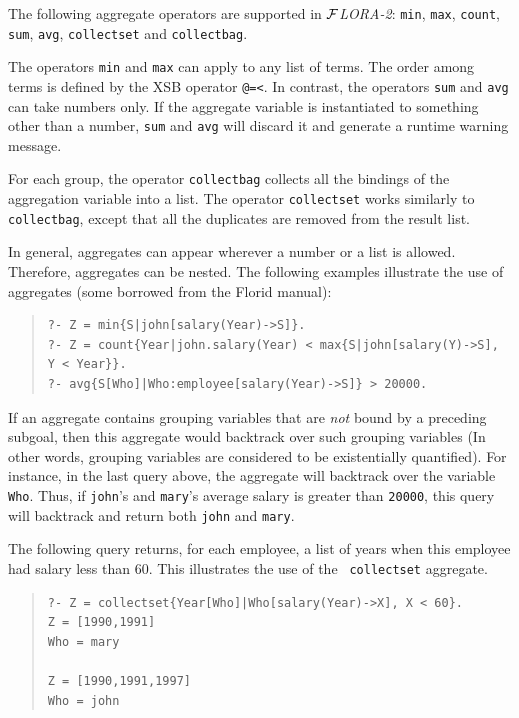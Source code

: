 \documentclass[11pt]{article}
\newcommand{\FLORA}{{\mbox{${\cal F}${\small\it LORA}\rm\emph{-2}}}\xspace}
\newcommand{\FLORID}{{\mbox{\sc Florid}}\xspace}
\begin{document}
%
The following aggregate operators are supported in \FLORA: {\tt min}, {\tt max},
{\tt count}, {\tt sum}, {\tt avg}, {\tt collectset} and {\tt collectbag}.

The operators {\tt min} and {\tt max} can apply to any list of
terms. The order among terms is defined by the XSB operator {\tt @=<}.  In
contrast, the operators {\tt sum} and {\tt avg} can take numbers only. If
the aggregate variable is instantiated to something other than a
number, {\tt sum} and {\tt avg} will discard it and generate a runtime
warning message.

For each group, the operator {\tt collectbag} collects all the bindings of
the aggregation variable into a list. The operator {\tt collectset} works
similarly to {\tt collectbag}, except that all the duplicates are removed
from the result list.

In general, aggregates can appear wherever a number or a list is
allowed. Therefore, aggregates can be nested. The following examples
illustrate the use of aggregates (some borrowed from the \FLORID manual):
\begin{quote}
\begin{verbatim}
?- Z = min{S|john[salary(Year)->S]}.
?- Z = count{Year|john.salary(Year) < max{S|john[salary(Y)->S], Y < Year}}.
?- avg{S[Who]|Who:employee[salary(Year)->S]} > 20000. 
\end{verbatim}
\end{quote}
If an aggregate contains grouping variables that are \emph{not} bound
by a preceding subgoal, then this aggregate would backtrack over such
grouping variables (In other words, grouping variables are considered to be
existentially quantified). For instance, in the last query above, the
aggregate will backtrack over the variable {\tt Who}. Thus, if
{\tt john}'s and {\tt mary}'s average salary is greater than {\tt 20000},
this query will backtrack and return both {\tt john} and {\tt mary}.

The following query returns, for each employee, a list of years when this
employee had salary less than 60. This illustrates the use of the {\tt
  collectset} aggregate.
\begin{quote}
\begin{verbatim}
?- Z = collectset{Year[Who]|Who[salary(Year)->X], X < 60}.
Z = [1990,1991]
Who = mary

Z = [1990,1991,1997]
Who = john
\end{verbatim}
\end{quote}
\end{document}
